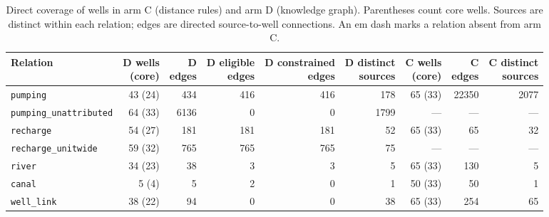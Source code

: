 \begin{table}[p]
\centering
\scriptsize
\setlength{\tabcolsep}{3pt}
\caption{Direct coverage of wells in arm C (distance rules) and arm D (knowledge graph). Parentheses count core wells. Sources are distinct within each relation; edges are directed source-to-well connections. An em dash marks a relation absent from arm C.}
\label{tab:arm-coverage}
\begin{tabular}{@{}lrrrrrrrr@{}}
\toprule
Relation & \shortstack{D wells\\(core)} & \shortstack{D\\edges} & \shortstack{D eligible\\edges} & \shortstack{D constrained\\edges} & \shortstack{D distinct\\sources} & \shortstack{C wells\\(core)} & \shortstack{C\\edges} & \shortstack{C distinct\\sources} \\
\midrule
\texttt{pumping} & \num{43} (\num{24}) & \num{434} & \num{416} & \num{416} & \num{178} & \num{65} (\num{33}) & \num{22350} & \num{2077} \\
\texttt{pumping\_unattributed} & \num{64} (\num{33}) & \num{6136} & \num{0} & \num{0} & \num{1799} & — & — & — \\
\texttt{recharge} & \num{54} (\num{27}) & \num{181} & \num{181} & \num{181} & \num{52} & \num{65} (\num{33}) & \num{65} & \num{32} \\
\texttt{recharge\_unitwide} & \num{59} (\num{32}) & \num{765} & \num{765} & \num{765} & \num{75} & — & — & — \\
\texttt{river} & \num{34} (\num{23}) & \num{38} & \num{3} & \num{3} & \num{5} & \num{65} (\num{33}) & \num{130} & \num{5} \\
\texttt{canal} & \num{5} (\num{4}) & \num{5} & \num{2} & \num{0} & \num{1} & \num{50} (\num{33}) & \num{50} & \num{1} \\
\texttt{well\_link} & \num{38} (\num{22}) & \num{94} & \num{0} & \num{0} & \num{38} & \num{65} (\num{33}) & \num{254} & \num{65} \\
\bottomrule
\end{tabular}
\end{table}

